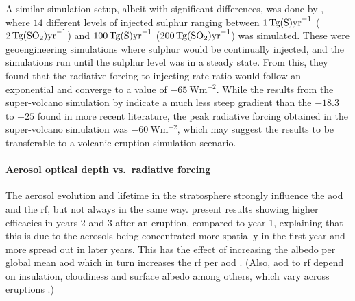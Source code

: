\documentclass{ametsocV5}
\begin{document}
A similar simulation setup, albeit with significant differences, was done by
\citet{niemeier2015}, where \(14\) different levels of injected sulphur ranging between
\(\SI{1}{\tera\gram(\ce{S})\mathrm{yr}^{-1}}\)
(\(\SI{2}{\tera\gram(\ce{SO2})\mathrm{yr}^{-1}}\)) and
\(\SI{100}{\tera\gram(\ce{S})\mathrm{yr}^{-1}}\)
(\(\SI{200}{\tera\gram(\ce{SO2})\mathrm{yr}^{-1}}\)) was simulated. These were
geoengineering simulations where sulphur would be continually injected, and the
simulations run until the sulphur level was in a steady state. From this, they found
that the radiative forcing to injecting rate ratio would follow an exponential and
converge to a value of \(\SI{-65}{\watt\metre^{-2}}\). While the results from the
super-volcano simulation by \citet{jones2005} indicate a much less steep gradient than
the \(-18.3\) to \(-25\) found in more recent literature, the peak radiative forcing
obtained in the super-volcano simulation was \(\SI{-60}{\watt\metre^{-2}}\), which may
suggest the \citet{niemeier2015} results to be transferable to a volcanic eruption
simulation scenario.

\paragraph*{Aerosol optical depth vs.\ radiative forcing}

The aerosol evolution and lifetime in the stratosphere strongly influence the
\acrshort{aod} and the \acrshort{rf}, but not always in the same way.
\citet{marshall2020} present results showing higher efficacies in years 2 and 3 after an
eruption, compared to year 1, explaining that this is due to the aerosols being
concentrated more spatially in the first year and more spread out in later years. This
has the effect of increasing the albedo per global mean \acrshort{aod} which in turn
increases the \acrshort{rf} per \acrshort{aod} \citep{marshall2020}. (Also,
\acrshort{aod} to \acrshort{rf} depend on insulation, cloudiness and surface albedo
among others, which vary across eruptions \citep{marshall2021,andersson2015}.)

\end{document}
